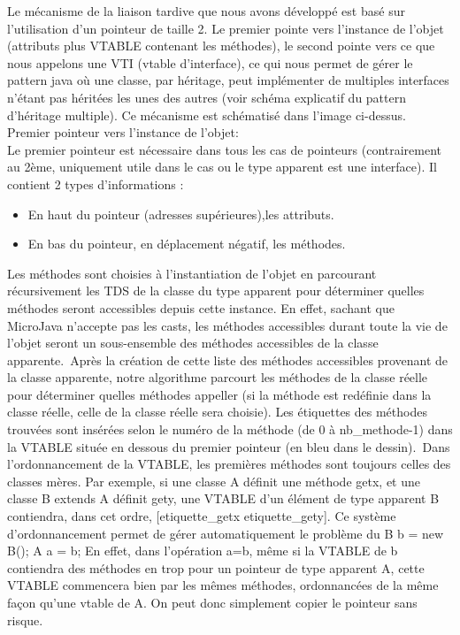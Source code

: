 
Le mécanisme de la liaison tardive que nous avons développé est basé sur l'utilisation
d'un pointeur de taille 2. Le premier pointe vers l'instance de l'objet (attributs
plus VTABLE contenant les méthodes), le second pointe vers ce que nous appelons
une VTI (vtable d'interface), ce qui nous permet de gérer le pattern java où une
classe, par héritage, peut implémenter de multiples interfaces n'étant pas
héritées les unes des autres (voir schéma explicatif du pattern d'héritage
multiple). Ce mécanisme est schématisé dans l'image ci-dessus.\\

Premier pointeur vers l'instance de l'objet:\\
Le premier pointeur est nécessaire dans tous les cas de pointeurs (contrairement
au 2ème, uniquement utile dans le cas ou le type apparent est une interface). Il
contient 2 types d'informations :\\

\begin{itemize}
	\item En haut du pointeur (adresses supérieures),les attributs.
	\item En bas du pointeur, en déplacement négatif, les méthodes.

\end{itemize}

Les méthodes sont choisies à l'instantiation de l'objet en parcourant récursivement
les TDS de la classe du type apparent pour déterminer quelles méthodes seront
accessibles depuis cette instance. En effet, sachant que MicroJava n'accepte pas
les casts, les méthodes accessibles durant toute la vie de l'objet seront un
sous-ensemble des méthodes accessibles de la classe apparente.\
Après la création de cette liste des méthodes accessibles provenant de la classe apparente, notre
algorithme parcourt les méthodes de la classe réelle pour déterminer quelles
méthodes appeller (si la méthode est redéfinie dans la classe réelle, celle de
la classe réelle sera choisie). Les étiquettes des méthodes trouvées sont
insérées selon le numéro de la méthode (de 0 à nb\_methode-1) dans la VTABLE
située en dessous du premier pointeur (en bleu dans le dessin).\
Dans l'ordonnancement de la VTABLE, les premières méthodes sont toujours celles
des classes mères. Par exemple, si une classe A définit une méthode getx, et une
classe B extends A définit gety, une VTABLE d'un élément de type apparent B
contiendra, dans cet ordre, [etiquette\_getx etiquette\_gety]. Ce système
d'ordonnancement permet de gérer automatiquement le problème du B b = new B(); A
a = b; En effet, dans l'opération a=b, même si la VTABLE de b contiendra des 
méthodes en trop pour un pointeur de type apparent A, cette
VTABLE commencera bien par les mêmes méthodes, ordonnancées de la même façon
qu'une vtable de A. On peut donc simplement copier le pointeur sans risque.\\

